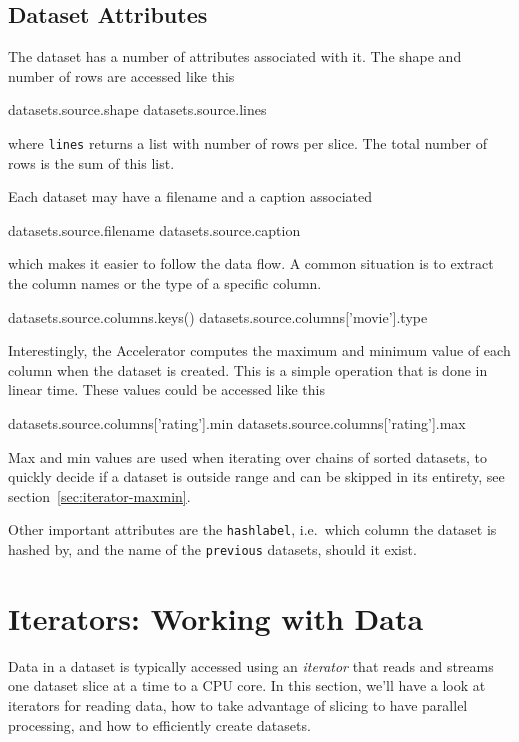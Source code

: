 \documentclass[a4paper]{article}
\begin{document}
\clearpage


\subsection{Dataset Attributes}
The dataset has a number of attributes associated with it.  The shape
and number of rows are accessed like this
\begin{python}
  datasets.source.shape
  datasets.source.lines
\end{python}
where \texttt{lines} returns a list with number of rows per slice.
The total number of rows is the sum of this list.

Each dataset may have a filename and a caption associated
\begin{python}
  datasets.source.filename
  datasets.source.caption
\end{python}
which makes it easier to follow the data flow.  A common situation is
to extract the column names or the type of a specific column.
\begin{python}
  datasets.source.columns.keys()
  datasets.source.columns['movie'].type
\end{python}

Interestingly, the Accelerator computes the maximum and minimum value
of each column when the dataset is created.  This is a simple
operation that is done in linear time.  These values could be accessed
like this
\begin{python}
  datasets.source.columns['rating'].min
  datasets.source.columns['rating'].max
\end{python}
Max and min values are used when iterating over chains of sorted
datasets, to quickly decide if a dataset is outside range and can be
skipped in its entirety, see section~\ref{sec:iterator-maxmin}.

Other important attributes are the \texttt{hashlabel}, i.e.\ which
column the dataset is hashed by, and the name of the \texttt{previous}
datasets, should it exist.

\clearpage




\section{Iterators: Working with Data}

Data in a dataset is typically accessed using an \emph{iterator} that
reads and streams one dataset slice at a time to a CPU core.  In this
section, we'll have a look at iterators for reading data, how to take
advantage of slicing to have parallel processing, and how to
efficiently create datasets.
\end{document}
